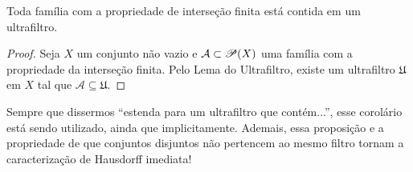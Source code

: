  \begin{corollary}
 Toda família com a propriedade de interseção finita
 está contida em um ultrafiltro.
 \end{corollary}

 \begin{proof}
 Seja 
 $X$
 um conjunto não vazio e
 $\mathcal{A} \subset {\mathscr{P}({X})}$
 uma família com a propriedade da interseção finita.
 Pelo Lema do Ultrafiltro,
 existe um ultrafiltro
 $\mathfrak{U}$
 em 
 $X$
 tal que
 $\mathcal{A} \subseteq \mathfrak{U}$.
 \end{proof}
 
 Sempre que dissermos
 ``estenda para um ultrafiltro que contém...'',
 esse corolário está sendo utilizado,
 ainda que implicitamente.
 Ademais, essa proposição e a propriedade de que
 conjuntos disjuntos não pertencem ao mesmo
 filtro tornam a caracterização de Hausdorff
 imediata!